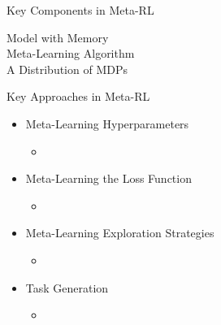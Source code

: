 \begin{frame}[c]{Key Components in Meta-RL}
	
\begin{description}
	\item[Model with Memory] 
	\item[Meta-Learning Algorithm]
	\item[A Distribution of MDPs]
\end{description}
	
	
\end{frame}
\begin{frame}[c]{Key Approaches in Meta-RL}
	
	\begin{itemize}
		\item Meta-Learning Hyperparameters
		\begin{itemize}
			\item 
		\end{itemize}
		\item Meta-Learning the Loss Function
		\begin{itemize}
			\item 
		\end{itemize}
		\item Meta-Learning Exploration Strategies
		\begin{itemize}
			\item 
		\end{itemize}
		\item Task Generation
		\begin{itemize}
			\item 
		\end{itemize}
		
	\end{itemize}
	
	
\end{frame}

